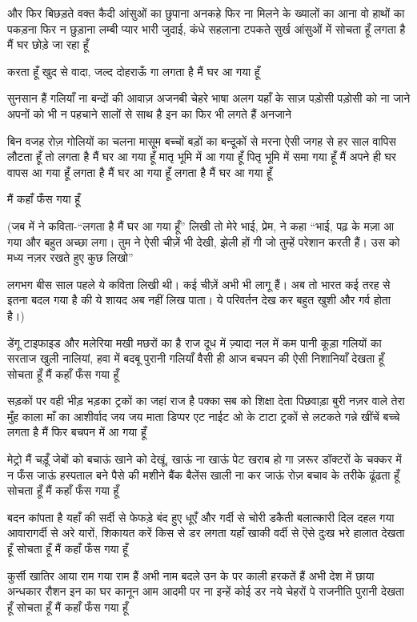 और फिर 
बिछड़ते वक्त कैदी आंसुओं का छुपाना
अनकहे फिर ना मिलने के ख्यालों का आना
वो हाथों का पकड़ना फिर न छुड़ाना
लम्बी प्यार भारी जुदाई, कंधे सहलाना
टपकते सुर्ख आंसुओं में सोचता हूँ
लगता है मैं घर छोड़े जा रहा हूँ

करता हूँ खुद से वादा, जल्द दोहराऊँ गा
लगता है मैं घर आ गया हूँ

सुनसान हैं गलियाँ ना बन्दों की आवाज़
अजनबी चेहरे भाषा अलग यहाँ के साज़
पड़ोसी पड़ोसी को ना जाने
अपनों को भी न पहचाने
सालों से साथ है इन का
फिर भी लगते हैं अनजाने

बिन वजह रोज़ गोलियों का चलना
मासूम बच्चों बड़ों का बन्दूकों से मरना
ऐसी जगह से हर साल वापिस लौटता हूँ
तो लगता है मैं घर आ गया हूँ
मातृ भूमि में आ गया हूँ
पितृ भूमि में समा गया हूँ
मैं अपने ही घर वापस आ गया हूँ
लगता है मैं घर आ गया हूँ
लगता है मैं घर आ गया हूँ

मैं कहाँ फँस गया हूँ 

(जब में ने कविता-“लगता है मैं घर आ गया
हूँ” लिखी तो मेरे भाई, प्रेम, ने कहा “भाई, 
पढ़ के मज़ा आ गया और बहुत अच्छा लगा। 
तुम ने ऐसी चीज़ें भी देखी, झेली हों गी जो
तुम्हें परेशान करती हैं। उस को मध्य नज़र
रखते हुए कुछ लिखो”

लगभग बीस साल पहले ये कविता लिखी
थी। कई चीज़ें अभी भी लागू हैं। अब तो
भारत कई तरह से इतना बदल गया है की ये
शायद अब नहीं लिख पाता। ये परिवर्तन देख
कर बहुत खुशी और गर्व होता है।) 






डेंगू टाइफाइड और मलेरिया
मखी मछरों का है राज
दूध में ज़्यादा नल में कम पानी
कूड़ा गलियों का सरताज
खुली नालियां, हवा में बदबू
पुरानी गलियाँ वैसी ही आज
बचपन की ऐसी निशानियाँ
देखता हूँ
सोचता हूँ मैं कहाँ फँस गया हूँ

सड़कों पर वही भीड़ भड़का
ट्रकों का जहां राज है पक्का
सब को शिक्षा देता पिछवाड़ा
बुरी नज़र वाले तेरा मुँह काला
माँ का आशीर्वाद जय जय माता
डिप्पर एट नाईट ओ के टाटा
ट्रकों से लटकते गन्ने खींचें बच्चे
      लगता है मैं फिर बचपन में आ गया हूँ

मेट्रो मैं चड़ूँ जेबों को बचाऊं
खाने को देखूं, खाऊं ना खाऊं
पेट खराब हो गा ज़रूर
डॉक्टरों के चक्कर में न फँस जाऊं
हस्पताल बने पैसे की मशीने
बैंक बैलेंस खाली ना कर जाऊं
रोज़ बचाव के तरीके ढूंढता हूँ
सोचता हूँ मैं कहाँ फँस गया हूँ

बदन कांपता है यहाँ की सर्दी से
फेफड़े बंद हुए धूएँ और गर्दी से
चोरी डकैती बलात्कारी
दिल दहल गया आवारागर्दी से
अरे यारों, शिकायत करें किस से
डर लगता यहाँ खाकी वर्दी से
ऎसे दुःख भरे हालात देखता हूँ
सोचता हूँ मैं कहाँ फँस गया हूँ

कुर्सी खातिर आया राम गया राम हैं अभी
नाम बदले उन के पर काली हरकतें हैं अभी
देश में छाया अन्धकार रौशन इन का घर
कानून आम आदमी पर ना इन्हें कोई डर
नये चेहरों पे राजनीति पुरानी देखता हूँ
सोचता हूँ मैं कहाँ फँस गया हूँ

